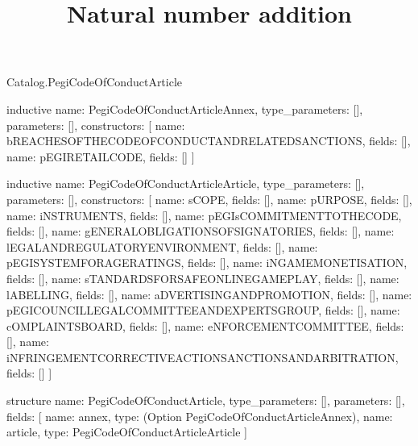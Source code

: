 \begin{lexlean}{Catalog.PegiCodeOfConductArticle}
\title{Natural number addition}
\begin{semanticmodule}
inductive{
  name: PegiCodeOfConductArticleAnnex,
  type_parameters: [],
  parameters: [],
  constructors: [
    {name: bREACHESOFTHECODEOFCONDUCTANDRELATEDSANCTIONS, fields: []},
    {name: pEGIRETAILCODE, fields: []}
  ]
}

inductive{
  name: PegiCodeOfConductArticleArticle,
  type_parameters: [],
  parameters: [],
  constructors: [
    {name: sCOPE, fields: []},
    {name: pURPOSE, fields: []},
    {name: iNSTRUMENTS, fields: []},
    {name: pEGIsCOMMITMENTTOTHECODE, fields: []},
    {name: gENERALOBLIGATIONSOFSIGNATORIES, fields: []},
    {name: lEGALANDREGULATORYENVIRONMENT, fields: []},
    {name: pEGISYSTEMFORAGERATINGS, fields: []},
    {name: iNGAMEMONETISATION, fields: []},
    {name: sTANDARDSFORSAFEONLINEGAMEPLAY, fields: []},
    {name: lABELLING, fields: []},
    {name: aDVERTISINGANDPROMOTION, fields: []},
    {name: pEGICOUNCILLEGALCOMMITTEEANDEXPERTSGROUP, fields: []},
    {name: cOMPLAINTSBOARD, fields: []},
    {name: eNFORCEMENTCOMMITTEE, fields: []},
    {name: iNFRINGEMENTCORRECTIVEACTIONSANCTIONSANDARBITRATION, fields: []}
  ]
}

structure{
  name: PegiCodeOfConductArticle,
  type_parameters: [],
  parameters: [],
  fields: [
    {name: annex, type: (Option PegiCodeOfConductArticleAnnex)},
    {name: article, type: PegiCodeOfConductArticleArticle}
  ]
}
\end{semanticmodule}
\end{lexlean}
